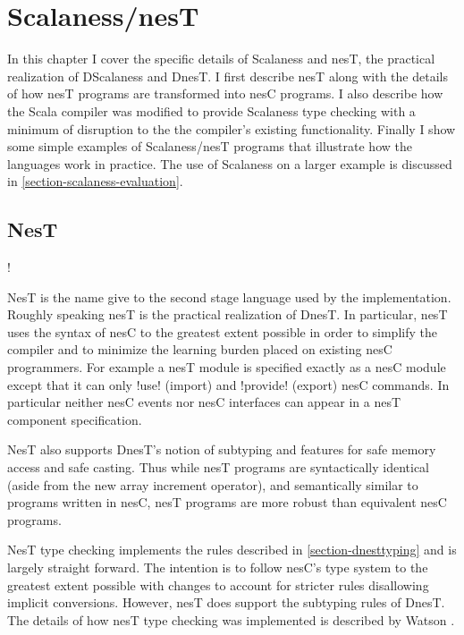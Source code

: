 \chapter{Scalaness/nesT}
\label{chapter-scalaness-nest}

In this chapter I cover the specific details of Scalaness and nesT, the practical realization of
DScalaness and DnesT. I first describe nesT along with the details of how nesT programs are
transformed into nesC programs. I also describe how the Scala compiler was modified to provide
Scalaness type checking with a minimum of disruption to the the compiler's existing
functionality. Finally I show some simple examples of Scalaness/nesT programs that illustrate
how the languages work in practice. The use of Scalaness on a larger example is discussed in
\autoref{section-scalaness-evaluation}.

\section{NesT}
\label{section-nest-implementation}

\lstset{language=nesC}
\lstMakeShortInline!

NesT is the name give to the second stage language used by the implementation. Roughly speaking
nesT is the practical realization of DnesT. In particular, nesT uses the syntax of nesC to the
greatest extent possible in order to simplify the compiler and to minimize the learning burden
placed on existing nesC programmers. For example a nesT module is specified exactly as a nesC
module except that it can only !use! (import) and !provide! (export) nesC commands. In
particular neither nesC events nor nesC interfaces can appear in a nesT component specification.

NesT also supports DnesT's notion of subtyping and features for safe memory access and safe
casting. Thus while nesT programs are syntactically identical (aside from the new array
increment operator), and semantically similar to programs written in nesC, nesT programs are
more robust than equivalent nesC programs.

NesT type checking implements the rules described in \autoref{section-dnesttyping} and is
largely straight forward. The intention is to follow nesC's type system to the greatest extent
possible with changes to account for stricter rules disallowing implicit conversions. However,
nesT does support the subtyping rules of DnesT. The details of how nesT type checking was
implemented is described by Watson \cite{watson-masters-2013}.

